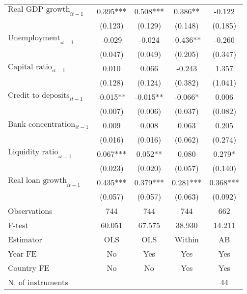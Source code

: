 \begin{longtable}{m{8cm}*{4}{c}}
$\text{Real GDP growth}_{it-1}$&       0.395***&       0.508***&       0.386** &      -0.122   \\
                    &     (0.123)   &     (0.129)   &     (0.148)   &     (0.185)   \\
$\text{Unemployment}_{it-1}$&      -0.029   &      -0.024   &      -0.436** &      -0.260   \\
                    &     (0.047)   &     (0.049)   &     (0.205)   &     (0.347)   \\
$\text{Capital ratio}_{it-1}$&       0.010   &       0.066   &      -0.243   &       1.357   \\
                    &     (0.128)   &     (0.124)   &     (0.382)   &     (1.041)   \\
$\text{Credit to deposits}_{it-1}$&      -0.015** &      -0.015** &      -0.066*  &       0.006   \\
                    &     (0.007)   &     (0.006)   &     (0.037)   &     (0.082)   \\
$\text{Bank concentration}_{it-1}$&       0.009   &       0.008   &       0.063   &       0.205   \\
                    &     (0.016)   &     (0.016)   &     (0.062)   &     (0.274)   \\
$\text{Liquidity ratio}_{it-1}$&       0.067***&       0.052** &       0.080   &       0.279*  \\
                    &     (0.023)   &     (0.020)   &     (0.057)   &     (0.140)   \\
$\text{Real loan growth}_{it-1}$&       0.435***&       0.379***&       0.281***&       0.368***\\
                    &     (0.057)   &     (0.057)   &     (0.063)   &     (0.092)   \\
\midrule
Observations        &         744   &         744   &         744   &         662   \\
F-test              &      60.051   &      67.575   &      38.930   &      14.211   \\
Estimator           &         OLS   &         OLS   &      Within   &          AB   \\
Year FE             &          No   &         Yes   &         Yes   &         Yes   \\
Country FE          &          No   &          No   &         Yes   &         Yes   \\
N. of instruments   &               &               &               &          44   \\

\end{longtable}
